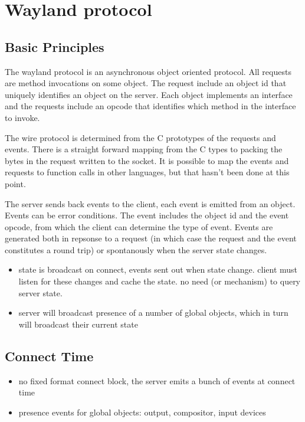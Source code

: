 \documentclass{article}
\begin{document}
\section{Wayland protocol}

\subsection{Basic Principles}

The wayland protocol is an asynchronous object oriented protocol.  All
requests are method invocations on some object.  The request include
an object id that uniquely identifies an object on the server.  Each
object implements an interface and the requests include an opcode that
identifies which method in the interface to invoke.

The wire protocol is determined from the C prototypes of the requests
and events.  There is a straight forward mapping from the C types to
packing the bytes in the request written to the socket.  It is
possible to map the events and requests to function calls in other
languages, but that hasn't been done at this point.

The server sends back events to the client, each event is emitted from
an object.  Events can be error conditions.  The event includes the
object id and the event opcode, from which the client can determine
the type of event.  Events are generated both in repsonse to a request
(in which case the request and the event constitutes a round trip) or
spontanously when the server state changes.

\begin{itemize}
\item state is broadcast on connect, events sent out when state
  change.  client must listen for these changes and cache the state.
  no need (or mechanism) to query server state.

\item server will broadcast presence of a number of global objects,
  which in turn will broadcast their current state
\end{itemize}

\subsection{Connect Time}

\begin{itemize}
\item no fixed format connect block, the server emits a bunch of
  events at connect time
\item presence events for global objects: output, compositor, input
  devices
\end{itemize}
\end{document}
